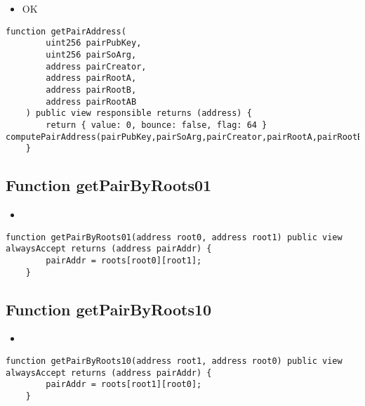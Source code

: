 \begin{itemize}
\item OK
\end{itemize}

\begin{lstlisting}[firstnumber=171]
	function getPairAddress(
		uint256 pairPubKey,
		uint256 pairSoArg,
		address pairCreator,
		address pairRootA,
		address pairRootB,
		address pairRootAB
	) public view responsible returns (address) {
		return { value: 0, bounce: false, flag: 64 } computePairAddress(pairPubKey,pairSoArg,pairCreator,pairRootA,pairRootB,pairRootAB);
	}
\end{lstlisting}

\subsection{Function getPairByRoots01}

\begin{itemize}
\item {}
\end{itemize}

\begin{lstlisting}[firstnumber=314]
	function getPairByRoots01(address root0, address root1) public view alwaysAccept returns (address pairAddr) {
		pairAddr = roots[root0][root1];
	}
\end{lstlisting}

\subsection{Function getPairByRoots10}

\begin{itemize}
\item {}
\end{itemize}

\begin{lstlisting}[firstnumber=318]
	function getPairByRoots10(address root1, address root0) public view alwaysAccept returns (address pairAddr) {
		pairAddr = roots[root1][root0];
	}
\end{lstlisting}

